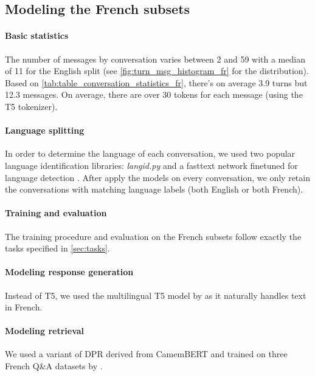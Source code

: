 \documentclass[11pt]{article}
\begin{document}
\subsection{Modeling the French subsets}
\label{sec:french_modeling}

\paragraph{Basic statistics} The number of messages by conversation varies between 2 and 59 with a median of 11 for the English split (see \autoref{fig:turn_msg_histogram_fr} for the distribution). Based on \autoref{tab:table_conversation_statistics_fr}, there's on average 3.9 turns but 12.3 messages. On average, there are over 30 tokens for each message (using the T5 tokenizer). 

\paragraph{Language splitting} In order to determine the language of each conversation, we used two popular language identification libraries: \textit{langid.py} \citep{lui_cross-domain_2011} and a fasttext network finetuned for language detection \citep{joulin-etal-2017-bag}. After apply the models on every conversation, we only retain the conversations with matching language labels (both English or both French). 

\paragraph{Training and evaluation} The training procedure and evaluation on the French subsets follow exactly the tasks specified in \autoref{sec:tasks}. 

\paragraph{Modeling response generation} Instead of T5, we used the multilingual T5 model by \citet{xue_mt5_2021} as it naturally handles text in French. 

\paragraph{Modeling retrieval} We used a variant of DPR derived from CamemBERT \cite{martin-etal-2020-camembert} and trained on three French Q\&A datasets \citep{keraron-etal-2020-project, dhoffschmidt_fquad_2020, kabbadj_french-squad_2021} by \citet{etalab_lab-ia_dpr_2021}.
\end{document}
